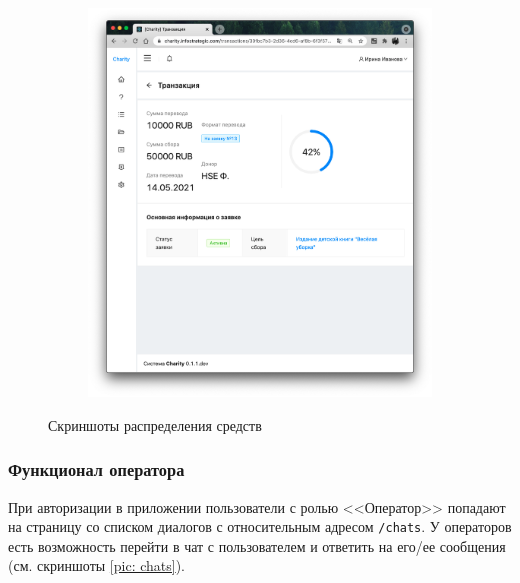 \documentclass[a4paper,12pt,reqno]{article}
\begin{document}
\begin{figure}[H]
\begin{subfigure}[b]{0.475\linewidth}
			\includegraphics[width=\linewidth]{img/ro/donation_distribute.png}
		\end{subfigure}
		\caption{Скриншоты распределения средств}
		\label{pic: distribute}
	\end{figure}
     
	\subsubsection{Функционал оператора}
	
	При авторизации в приложении пользователи с ролью <<Оператор>> попадают на страницу со списком диалогов с относительным адресом \texttt{/chats}. У операторов есть возможность перейти в чат с пользователем и ответить на его/ее сообщения (см. скриншоты \ref{pic: chats}). 
	
\end{document}
